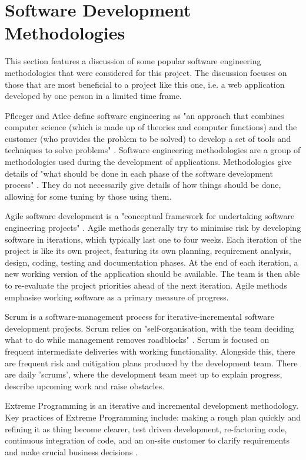 \documentclass[authoryearcitations]{UoYCSproject}
\begin{document}
\section{Software Development Methodologies}

This section features a discussion of some popular software engineering methodologies that were considered for this project. The discussion focuses on those that are most beneficial to a project like this one, i.e. a web application developed by one person in a limited time frame. 

Pfleeger and Atlee define software engineering as "an approach that combines computer science (which is made up of theories and computer functions) and the customer (who provides the problem to be solved) to develop a set of tools and techniques to solve problems" \citep{Pfleeger}. Software engineering methodologies are a group of methodologies used during the development of applications. Methodologies give details of "what should be done in each phase of the software development process" \citep{Mnkandla2009}. They do not necessarily give details of how things should be done, allowing for some tuning by those using them. 

Agile software development is a "conceptual framework for undertaking software engineering projects" \citep{ITKnowledgePortal}. Agile methods generally try to minimise risk by developing software in iterations, which typically last one to four weeks. Each iteration of the project is like its own project, featuring its own planning, requirement analysis, design, coding, testing and documentation phases. At the end of each iteration, a new working version of the application should be available. The team is then able to re-evaluate the project priorities ahead of the next iteration. Agile methods emphasise working software as a primary measure of progress.

Scrum is a software-management process for iterative-incremental software development projects. Scrum relies on "self-organisation, with the team deciding what to do while management removes roadblocks" \citep{Faridani2011}. Scrum is focused on frequent intermediate deliveries with working functionality. Alongside this, there are frequent risk and mitigation plans produced by the development team. There are daily 'scrums', where the development team meet up to explain progress, describe upcoming work and raise obstacles. 

Extreme Programming is an iterative and incremental development methodology. Key practices of Extreme Programming include: making a rough plan quickly and refining it as thing become clearer, test driven development, re-factoring code, continuous integration of code, and an on-site customer to clarify requirements and make crucial business decisions \citep{Faridani2011}. 
\end{document}
